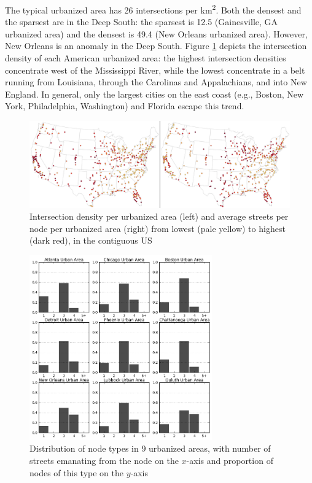 \documentclass[Afour,sageh,times]{sagej}
\begin{document}
The typical urbanized area has 26 intersections per km\textsuperscript{2}. Both the densest and the sparsest are in the Deep South: the sparsest is 12.5 (Gainesville, GA urbanized area) and the densest is 49.4 (New Orleans urbanized area). However, New Orleans is an anomaly in the Deep South. Figure \ref{fig01} depicts the intersection density of each American urbanized area: the highest intersection densities concentrate west of the Mississippi River, while the lowest concentrate in a belt running from Louisiana, through the Carolinas and Appalachians, and into New England. In general, only the largest cities on the east coast (e.g., Boston, New York, Philadelphia, Washington) and Florida escape this trend.

\begin{figure}
	\includegraphics[width=1\textwidth]{fig01.png}
	\caption{Intersection density per urbanized area (left) and average streets per node per urbanized area (right) from lowest (pale yellow) to highest (dark red), in the contiguous US}
	\label{fig01}
\end{figure}

\begin{figure}
	\includegraphics[width=0.7\textwidth]{fig02.png}
	\caption{Distribution of node types in 9 urbanized areas, with number of streets emanating from the node on the $x$-axis and proportion of nodes of this type on the $y$-axis }
	\label{fig02}
\end{figure}
\end{document}
